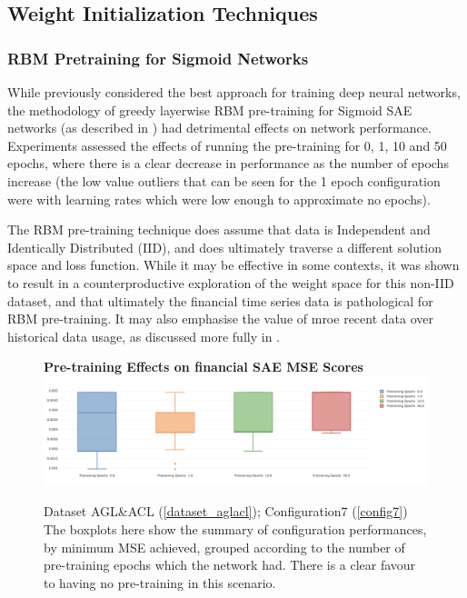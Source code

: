 \documentclass[a4paper,11pt,oneside]{article}
\theoremstyle{plain}
\theoremstyle{definition}
\begin{document}
\subsection{Weight Initialization Techniques}

\subsubsection{RBM Pretraining for Sigmoid Networks}

While previously considered the best approach for training deep neural networks, the methodology of greedy layerwise RBM pre-training for Sigmoid SAE networks (as described in \cite{Hinton2}) had detrimental effects on network performance. Experiments assessed the effects of running the pre-training for 0, 1, 10 and 50 epochs, where there is a clear decrease in performance as the number of epochs increase (the low value outliers that can be seen for the 1 epoch configuration were with learning rates which were low enough to approximate no epochs). \newline

The RBM pre-training technique does assume that data is Independent and Identically Distributed (IID), and does ultimately traverse a different solution space and loss function. While it may be effective in some contexts, it was shown to result in a counterproductive exploration of the weight space for this non-IID dataset, and that ultimately the financial time series data is pathological for RBM pre-training. It may also emphasise the value of mroe recent data over historical data usage, as discussed more fully in . \newline

\begin{figure}[H]
	\centering
	\textbf{Pre-training Effects on financial SAE MSE Scores} 
	\includegraphics[scale=0.3]{images/iteration_two/pt/SAE_Pre-training_epochs_Min_Test_MSE.png}
	\caption{Dataset AGL\&ACL (\ref{dataset_aglacl}); Configuration7 (\ref{config7})
		\newline \newline The boxplots here show the summary of configuration performances, by minimum MSE achieved, grouped according to the number of pre-training epochs which the network had. There is a clear favour to having no pre-training in this scenario.}
	\label{figure-results-pretraining-effect}
\end{figure}		
\end{document}
